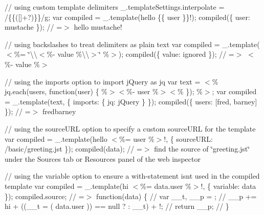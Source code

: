 // using custom template delimiters \+\_\+.\+template\+Settings.\+interpolate = /\{\{(\mbox{[}\mbox{]}+?)\}\}/g; var compiled = \+\_\+.\+template(\textquotesingle{}hello \{\{ user \}\}!\textquotesingle{}); compiled(\{ \textquotesingle{}user\textquotesingle{}\+: \textquotesingle{}mustache\textquotesingle{} \}); // =$>$ \textquotesingle{}hello mustache!\textquotesingle{}

// using backslashes to treat delimiters as plain text var compiled = \+\_\+.\+template(\textquotesingle{}$<$\%= \char`\"{}\textbackslash{}\textbackslash{}$<$\%-\/ value \%\textbackslash{}\textbackslash{}$>$\char`\"{} \%$>$\textquotesingle{}); compiled(\{ \textquotesingle{}value\textquotesingle{}\+: \textquotesingle{}ignored\textquotesingle{} \}); // =$>$ \textquotesingle{}$<$\%-\/ value \%$>$\textquotesingle{}

// using the {\ttfamily imports} option to import {\ttfamily j\+Query} as {\ttfamily jq} var text = \textquotesingle{}$<$\% jq.\+each(users, function(user) \{ \%$>$$<$\%-\/ user \%$>$$<$\% \}); \%$>$\textquotesingle{}; var compiled = \+\_\+.\+template(text, \{ \textquotesingle{}imports\textquotesingle{}\+: \{ \textquotesingle{}jq\textquotesingle{}\+: j\+Query \} \}); compiled(\{ \textquotesingle{}users\textquotesingle{}\+: \mbox{[}\textquotesingle{}fred\textquotesingle{}, \textquotesingle{}barney\textquotesingle{}\mbox{]} \}); // =$>$ \textquotesingle{}fredbarney\textquotesingle{}

// using the {\ttfamily source\+U\+R\+L} option to specify a custom source\+U\+R\+L for the template var compiled = \+\_\+.\+template(\textquotesingle{}hello $<$\%= user \%$>$!\textquotesingle{}, \{ \textquotesingle{}source\+U\+R\+L\textquotesingle{}\+: \textquotesingle{}/basic/greeting.jst\textquotesingle{} \}); compiled(data); // =$>$ find the source of \char`\"{}greeting.\+jst\char`\"{} under the Sources tab or Resources panel of the web inspector

// using the {\ttfamily variable} option to ensure a with-\/statement isn\textquotesingle{}t used in the compiled template var compiled = \+\_\+.\+template(\textquotesingle{}hi $<$\%= data.\+user \%$>$!\textquotesingle{}, \{ \textquotesingle{}variable\textquotesingle{}\+: \textquotesingle{}data\textquotesingle{} \}); compiled.\+source; // =$>$ function(data) \{ // var \+\_\+\+\_\+t, \+\_\+\+\_\+p = \textquotesingle{}\textquotesingle{}; // \+\_\+\+\_\+p += \textquotesingle{}hi \textquotesingle{} + ((\+\_\+\+\_\+t = ( data.\+user )) == null ? \textquotesingle{}\textquotesingle{} \+: \+\_\+\+\_\+t) + \textquotesingle{}!\textquotesingle{}; // return \+\_\+\+\_\+p; // \}

